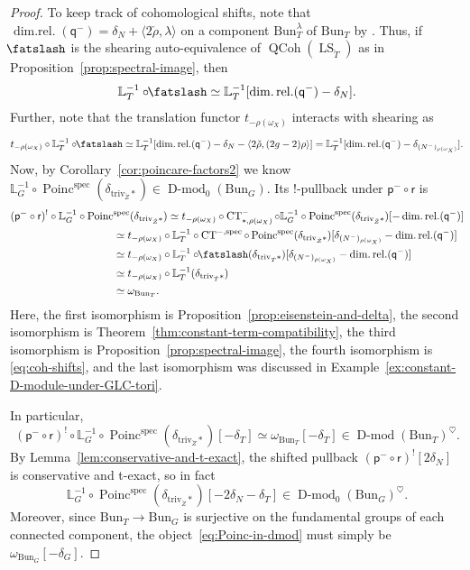 \documentclass[11pt]{amsart}
\newcommand{\shear}{{\mathbin{\mkern-6mu\fatslash}}}
\newcommand{\triv}{\mathrm{triv}}
\newcommand{\spec}{\mathrm{spec}}
\newcommand{\Bun}{{\mathrm{Bun}}}
\newcommand{\CT}{\operatorname{CT}}
\newcommand{\Poinc}{\operatorname{Poinc}}
\newcommand{\pp}{{\mathsf{p}}}
\newcommand{\qq}{{\mathsf{q}}}
\newcommand{\rr}{{\mathsf{r}}}
\DeclareMathOperator{\QCoh}{QCoh}
\DeclareMathOperator{\Dmod}{D-mod}
\DeclareMathOperator{\LS}{LS}
\theoremstyle{remark}
\theoremstyle{definition}
\begin{document}
\begin{proof}
To keep track of cohomological shifts, note that $\operatorname{dim.rel.}(\qq^-)=\delta_N+\langle2\check\rho,\lambda\rangle$ on a component $\Bun_T^\lambda$ of $\Bun_T$ by \cite[\S7.2.2]{GLC5}. Thus, if $\shear$ is the shearing auto-equivalence of $\QCoh(\LS_{\check T})$ as in Proposition~\ref{prop:spectral-image}, then
\[
\mathbb L_T^{-1}\circ\shear\simeq\mathbb L_T^{-1}[\operatorname{dim.rel.}(\qq^-)-\delta_N].
\]
Further, note that the translation functor $t_{-\rho(\omega_X)}$ interacts with shearing as
\begin{equation}\label{eq:coh-shifts}
t_{-\rho(\omega_X)}\circ\mathbb L_T^{-1}\circ\shear\simeq\mathbb L_T^{-1}[\operatorname{dim.rel.}(\qq^-)-\delta_N-\langle2\check\rho,(2g-2)\rho\rangle]=\mathbb L_T^{-1}[\operatorname{dim.rel.}(\qq^-)-\delta_{(N^-)_{\rho(\omega_X)}}].
\end{equation}
Now, by Corollary~\ref{cor:poincare-factors2} we know $\mathbb L_G^{-1}\circ\Poinc^\spec(\delta_{\triv_{\check Z}*})\in\Dmod_0(\Bun_G)$. Its $!$-pullback under $\pp^-\circ\rr$ is
\begin{align*}
    (\pp^-\circ\rr)^!\circ\mathbb L_G^{-1}\circ\Poinc&^\spec(\delta_{\triv_{\check Z}*})\simeq t_{-\rho(\omega_X)}\circ\CT^-_{*,\rho(\omega_X)}\circ \mathbb L_G^{-1}\circ\Poinc^\spec(\delta_{\triv_{\check Z}*})[-\operatorname{dim.rel.}(\qq^-)]\\
    &\simeq t_{-\rho(\omega_X)}\circ\mathbb L_T^{-1}\circ\CT^{-,\spec}\circ\Poinc^\spec(\delta_{\triv_{\check Z}*})[\delta_{(N^-)_{\rho(\omega_X)}}-\operatorname{dim.rel.}(\qq^-)]\\
    &\simeq t_{-\rho(\omega_X)}\circ\mathbb L_T^{-1}\circ\shear(\delta_{\triv_{\check T}*})[\delta_{(N^-)_{\rho(\omega_X)}}-\operatorname{dim.rel.}(\qq^-)]\\
    &\simeq t_{-\rho(\omega_X)}\circ\mathbb L_T^{-1}(\delta_{\triv_{\check T}*})\\
    &\simeq \omega_{\Bun_T}.
\end{align*}
Here, the first isomorphism is Proposition~\ref{prop:eisenstein-and-delta}, the second isomorphism is Theorem~\ref{thm:constant-term-compatibility}, the third isomorphism is Proposition~\ref{prop:spectral-image}, the fourth isomorphism is \eqref{eq:coh-shifts}, and the last isomorphism was discussed in Example~\ref{ex:constant-D-module-under-GLC-tori}.

In particular,
\[
(\pp^-\circ\rr)^!\circ\mathbb L_G^{-1}\circ\Poinc^\spec(\delta_{\triv_{\check Z}*})[-\delta_T]\simeq\omega_{\Bun_T}[-\delta_T]\in\Dmod(\Bun_T)^\heartsuit.
\]
    By Lemma~\ref{lem:conservative-and-t-exact}, the shifted pullback $(\pp^-\circ\rr)^![2\delta_N]$ is conservative and t-exact, so in fact \begin{equation}\label{eq:Poinc-in-dmod}\mathbb L_G^{-1}\circ\Poinc^\spec(\delta_{\triv_{\check Z}*})[-2\delta_N-\delta_T]\in\Dmod_0(\Bun_G)^\heartsuit.\end{equation} 
    Moreover, since $\Bun_T\to\Bun_G$ is surjective on the fundamental groups of each connected component, the object~\eqref{eq:Poinc-in-dmod} must simply be $\omega_{\Bun_G}[-\delta_G]$.
\end{proof}
\end{document}
